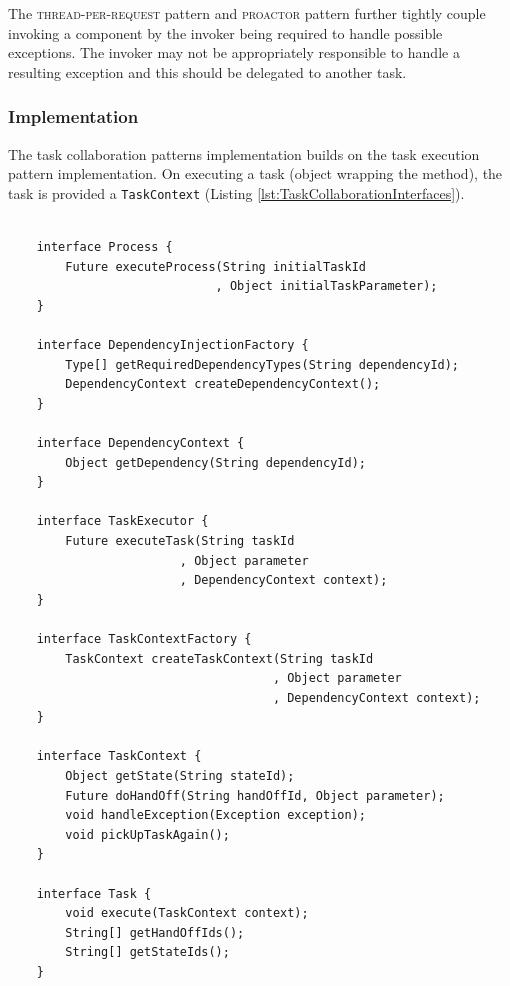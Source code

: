 \documentclass[prodmode]{style/acmlarge}
\begin{document}
The \textsc{thread-per-request} pattern and \textsc{proactor} pattern further
tightly couple invoking a component by the invoker being required to handle
possible exceptions.  The invoker may not be appropriately responsible to handle
a resulting exception and this should be delegated to another task.


\subsubsection*{Implementation}

The task collaboration patterns implementation builds on the task execution
pattern implementation.  On executing a task (object wrapping the method), the
task is provided a \texttt{TaskContext} (Listing
\ref{lst:TaskCollaborationInterfaces}).

\lstset{caption=Task collaboration pattern interfaces\protect\footnotemark.}
\begin{lstlisting}[float,label=lst:TaskCollaborationInterfaces]

    interface Process {
        Future executeProcess(String initialTaskId
                             , Object initialTaskParameter);
    }

    interface DependencyInjectionFactory {
        Type[] getRequiredDependencyTypes(String dependencyId);
        DependencyContext createDependencyContext();
    }
    
    interface DependencyContext {
        Object getDependency(String dependencyId);
    }

    interface TaskExecutor {
        Future executeTask(String taskId 
                        , Object parameter
                        , DependencyContext context);
    }

    interface TaskContextFactory {
        TaskContext createTaskContext(String taskId
                                     , Object parameter
                                     , DependencyContext context);
    }

    interface TaskContext {
        Object getState(String stateId);
        Future doHandOff(String handOffId, Object parameter);
        void handleException(Exception exception);
        void pickUpTaskAgain();
    }

    interface Task {
        void execute(TaskContext context);
        String[] getHandOffIds();
        String[] getStateIds();
    }
\end{lstlisting}
\end{document}
